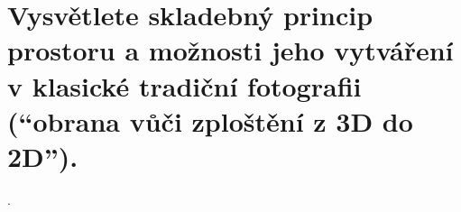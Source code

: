 \section{Vysvětlete skladebný princip prostoru a možnosti jeho vytváření v klasické tradiční fotografii 
(\enquote{obrana vůči zploštění z 3D do 2D}).}.